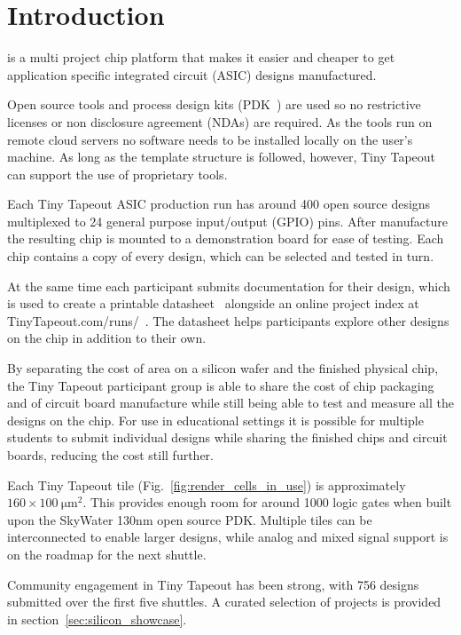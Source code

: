 \section{Introduction}
\label{sec:introduction}
 is a multi project chip platform that makes it easier and cheaper to get application specific integrated circuit (ASIC) designs manufactured.

Open source tools and process design kits (PDK~\cite{pdk}) are used so no restrictive licenses or non disclosure agreement (NDAs) are required. As the tools run on remote cloud servers no software needs to be installed locally on the user's machine. As long as the template structure is followed, however, Tiny Tapeout can support the use of proprietary tools.

Each Tiny Tapeout ASIC production run has around 400 open source designs multiplexed to 24 general purpose input/output (GPIO) pins. After manufacture the resulting chip is mounted to a demonstration board for ease of testing. Each chip contains a copy of every design, which can be selected and tested in turn.

At the same time each participant submits documentation for their design, which is used to create a printable datasheet~\cite{datasheet} alongside an online project index at TinyTapeout.com/runs/~\cite{tinytapeoutruns}. The datasheet helps participants explore other designs on the chip in addition to their own.

By separating the cost of area on a silicon wafer and the finished physical chip, the Tiny Tapeout participant group is able to share the cost of chip packaging and of circuit board manufacture while still being able to test and measure all the designs on the chip. For use in educational settings it is possible for multiple students to submit individual designs while sharing the finished chips and circuit boards, reducing the cost still further.

Each Tiny Tapeout tile (Fig.~\ref{fig:render_cells_in_use}) is approximately $160 \times \qty{100}{\micro\meter\squared}$. This provides enough room for around 1000 logic gates when built upon the SkyWater 130nm open source PDK. Multiple tiles can be interconnected to enable larger designs, while analog and mixed signal support is on the roadmap for the next shuttle.

Community engagement in Tiny Tapeout has been strong, with 756 designs submitted over the first five shuttles. A curated selection of projects is provided in section~\ref{sec:silicon_showcase}.

